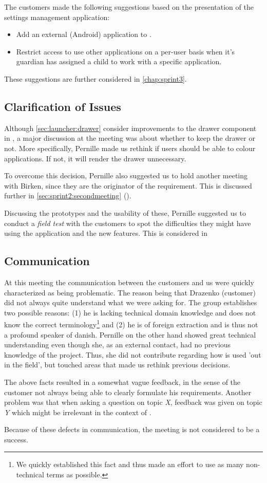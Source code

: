 The customers made the following suggestions based on the presentation of the settings management application:

\begin{itemize}
\item Add an external (Android) application to \launcher.
\item Restrict access to use other applications on a per-user basis when it's guardian has assigned a child to work with a specific application.
\end{itemize}

These suggestions are further considered in \cref{chap:sprint3}.


\subsection{Clarification of Issues}
Although \cref{sec:launcher:drawer} consider improvements to the drawer component in \giraf, a major discussion at the meeting was about whether to keep the drawer or not.
More specifically, Pernille made us rethink if users should be able to colour applications.
If not, it will render the drawer unnecessary.

To overcome this decision, Pernille also suggested us to hold another meeting with Birken, since they are the originator of the requirement.
This is discussed further in \cref{sec:sprint2:secondmeeting} ().

Discussing the prototypes and the usability of these, Pernille suggested us to conduct a \textit{field test} with the customers to spot the difficulties they might have using the application and the new features.
This is considered in 


\subsection{Communication}
At this meeting the communication between the customers and us were quickly characterized as being problematic.
The reason being that Drazenko (customer) did not always quite understand what we were asking for.
The group establishes two possible reasons:
(1) he is lacking technical domain knowledge and does not know the correct terminology\footnote{We quickly established this fact and thus made an effort to use as many non-technical terms as possible.} and (2) he is of foreign extraction and is thus not a profound speaker of danish.
Pernille on the other hand showed great technical understanding even though she, as an external contact, had no previous knowledge of the \giraf project.
Thus, she did not contribute regarding how \giraf is used 'out in the field', but touched areas that made us rethink previous decisions.

The above facts resulted in a somewhat vague feedback, in the sense of the customer not always being able to clearly formulate his requirements.
Another problem was that when asking a question on topic \textit{X}, feedback was given on topic \textit{Y} which might be irrelevant in the context of \launcher.

Because of these defects in communication, the meeting is not considered to be a success.